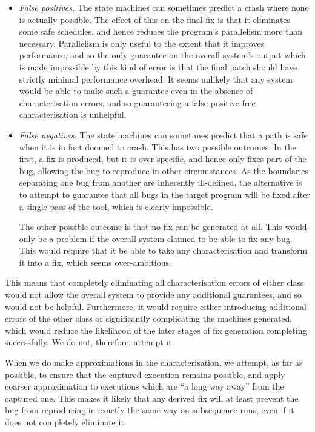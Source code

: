 \documentclass[10pt,twocolumn,preprint,natbib,authoryear]{sigplanconf}
\begin{document}
\begin{itemize}
\item \emph{False positives.}  The state machines can sometimes
  predict a crash where none is actually possible.  The effect of this
  on the final fix is that it eliminates some safe schedules, and
  hence reduces the program's parallelism more than necessary.
  Parallelism is only useful to the extent that it improves
  performance, and so the only guarantee on the overall system's
  output which is made impossible by this kind of error is that the
  final patch should have strictly minimal performance overhead.  It
  seems unlikely that any system would be able to make such a
  guarantee even in the absence of characterisation errors, and so
  guaranteeing a false-positive-free characterisation is unhelpful.

\item \emph{False negatives.}  The state machines can sometimes
  predict that a path is safe when it is in fact doomed to crash.
  This has two possible outcomes.  In the first, a fix is produced,
  but it is over-specific, and hence only fixes part of the bug,
  allowing the bug to reproduce in other circumstances.  As the
  boundaries separating one bug from another are inherently
  ill-defined, the alternative is to attempt to guarantee that
  all bugs in the target program will be fixed after a single pass
  of the tool, which is clearly impossible.

  The other possible outcome is that no fix can be generated at all.
  This would only be a problem if the overall system claimed to be
  able to fix any bug.  This would require that it be able to take any
  characterisation and transform it into a fix, which seems
  over-ambitious.
\end{itemize}

This means that completely eliminating all characterisation errors of
either class would not allow the overall system to provide any
additional guarantees, and so would not be helpful.  Furthermore, it
would require either introducing additional errors of the other class
or significantly complicating the machines generated, which would
reduce the likelihood of the later stages of fix generation completing
successfully.  We do not, therefore, attempt it.

When we do make approximations in the characterisation, we attempt, as
far as possible, to ensure that the captured execution remains
possible, and apply coarser approximation to executions which are ``a
long way away'' from the captured one.  This makes it likely that any
derived fix will at least prevent the bug from reproducing in exactly
the same way on subsequence runs, even if it does not completely
eliminate it.
\end{document}
